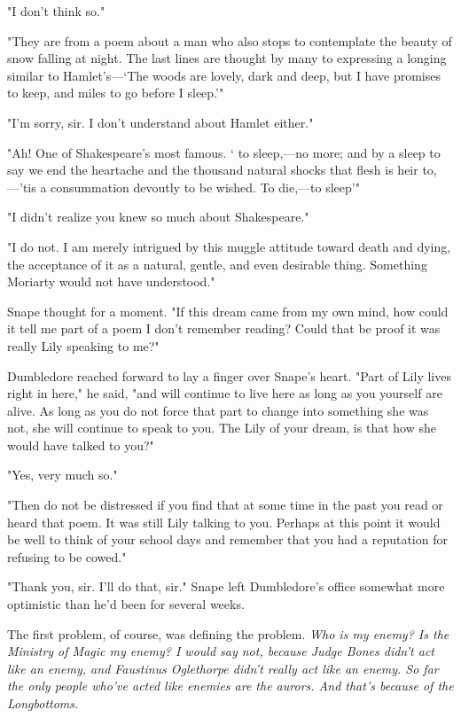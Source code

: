 "I don't think so."

"They are from a poem about a man who also stops to contemplate the beauty of snow falling at night. The last lines are thought by many to expressing a longing similar to Hamlet's—`The woods are lovely, dark and deep, but I have promises to keep, and miles to go before I sleep.'"

"I'm sorry, sir. I don't understand about Hamlet either."

"Ah! One of Shakespeare's most famous. `{\el} to sleep,—no more; and by a sleep to say we end the heartache and the thousand natural shocks that flesh is heir to,—'tis a consummation devoutly to be wished. To die,—to sleep{\el}'"

"I didn't realize you knew so much about Shakespeare."

"I do not. I am merely intrigued by this muggle attitude toward death and dying, the acceptance of it as a natural, gentle, and even desirable thing. Something Moriarty would not have understood."

Snape thought for a moment. "If this dream came from my own mind, how could it tell me part of a poem I don't remember reading? Could that be proof it was really Lily speaking to me?"

Dumbledore reached forward to lay a finger over Snape's heart. "Part of Lily lives right in here," he said, "and will continue to live here as long as you yourself are alive. As long as you do not force that part to change into something she was not, she will continue to speak to you. The Lily of your dream, is that how she would have talked to you?"

"Yes, very much so."

"Then do not be distressed if you find that at some time in the past you read or heard that poem. It was still Lily talking to you. Perhaps at this point it would be well to think of your school days and remember that you had a reputation for refusing to be cowed."

"Thank you, sir. I'll do that, sir." Snape left Dumbledore's office somewhat more optimistic than he'd been for several weeks.

The first problem, of course, was defining the problem. \emph{Who is my enemy? Is the Ministry of Magic my enemy? I would say not, because Judge Bones didn't act like an enemy, and Faustinus Oglethorpe didn't really act like an enemy. So far the only people who've acted like enemies are the aurors. And that's because of the Longbottoms.}

